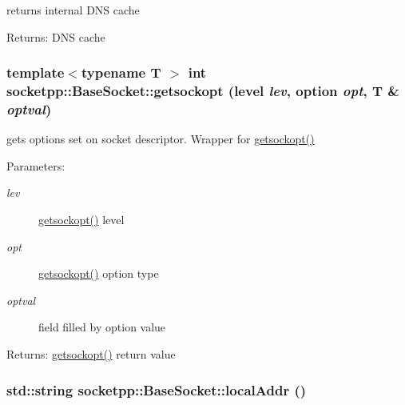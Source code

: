 \begin{CompactItemize}
returns internal DNS cache 

\begin{Desc}
\item[Returns:]DNS cache \end{Desc}
\hypertarget{classsocketpp_1_1BaseSocket_c845c3a037f0f400fd50dfb58706b6e4}{
\subsubsection[{getsockopt}]{\setlength{\rightskip}{0pt plus 5cm}template$<$typename T $>$ int socketpp::BaseSocket::getsockopt ({\bf level} {\em lev}, \/  {\bf option} {\em opt}, \/  T \& {\em optval})}}
\label{classsocketpp_1_1BaseSocket_c845c3a037f0f400fd50dfb58706b6e4}


gets options set on socket descriptor. Wrapper for \hyperlink{classsocketpp_1_1BaseSocket_c845c3a037f0f400fd50dfb58706b6e4}{getsockopt()} 

\begin{Desc}
\item[Parameters:]
\begin{description}
\item[{\em lev}]\hyperlink{classsocketpp_1_1BaseSocket_c845c3a037f0f400fd50dfb58706b6e4}{getsockopt()} level \item[{\em opt}]\hyperlink{classsocketpp_1_1BaseSocket_c845c3a037f0f400fd50dfb58706b6e4}{getsockopt()} option type \item[{\em optval}]field filled by option value \end{description}
\end{Desc}
\begin{Desc}
\item[Returns:]\hyperlink{classsocketpp_1_1BaseSocket_c845c3a037f0f400fd50dfb58706b6e4}{getsockopt()} return value \end{Desc}
\hypertarget{classsocketpp_1_1BaseSocket_0caed2e7d3f0e4db7d4c1aa3aba52caf}{
\subsubsection[{localAddr}]{\setlength{\rightskip}{0pt plus 5cm}std::string socketpp::BaseSocket::localAddr ()}}
\label{classsocketpp_1_1BaseSocket_0caed2e7d3f0e4db7d4c1aa3aba52caf}



\end{CompactItemize}
